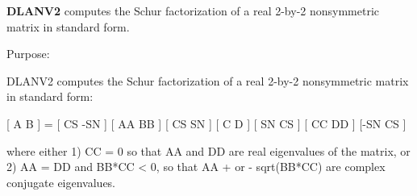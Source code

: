 {\bfseries D\+L\+A\+N\+V2} computes the Schur factorization of a real 2-\/by-\/2 nonsymmetric matrix in standard form. 

 \begin{DoxyParagraph}{Purpose\+: }
\begin{DoxyVerb} DLANV2 computes the Schur factorization of a real 2-by-2 nonsymmetric
 matrix in standard form:

      [ A  B ] = [ CS -SN ] [ AA  BB ] [ CS  SN ]
      [ C  D ]   [ SN  CS ] [ CC  DD ] [-SN  CS ]

 where either
 1) CC = 0 so that AA and DD are real eigenvalues of the matrix, or
 2) AA = DD and BB*CC < 0, so that AA + or - sqrt(BB*CC) are complex
 conjugate eigenvalues.\end{DoxyVerb}
 
\end{DoxyParagraph}

